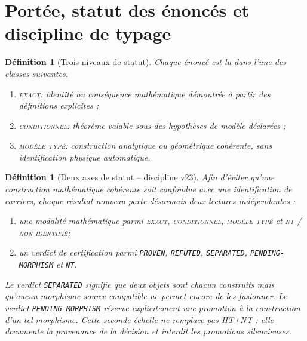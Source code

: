 \documentclass[11pt,a4paper]{article}
\newtheorem{definition}[theorem]{Définition}
\newcommand{\rank}{\operatorname{rank}}
\newcommand{\statusExact}{\textsc{exact}}
\newcommand{\statusCond}{\textsc{conditionnel}}
\newcommand{\statusTyped}{\textsc{modèle typé}}
\newcommand{\statusNT}{\textsc{nt / non identifié}}
\newcommand{\certProven}{\texttt{PROVEN}}
\newcommand{\certRefuted}{\texttt{REFUTED}}
\newcommand{\certSeparated}{\texttt{SEPARATED}}
\newcommand{\certPending}{\texttt{PENDING-MORPHISM}}
\newcommand{\certNT}{\texttt{NT}}
\begin{document}
\begin{abstract}
La version v28 matérialise enfin un census machine-readable des neuf arêtes des deux germes historiques effectivement audités, avec les champs $(\tau_e,L_e,\sigma_e,\varepsilon_e)$, et rejoue directement le test de rang tordu. Le croisement $X_6$ donne $\rank D_c=\rank[D_c\mid s]=5$ et la fissure $Y_3$ donne $3=3$. Le corpus ne fournit toutefois pas l'énumération exhaustive du graphe dual historique : le verdict global reste NT plutôt que d'être complété artificiellement. Sur le fibré Krein, la partie continue est paramétrée par une rapidité additive $\chi$ dans $SO^+(1,1)$; son holonomie est nulle sur le croisement et la fissure audités. Toute obstruction continue restante est donc globale et se réduit à un second test de rang $\rank D_0=\rank[D_0\mid\chi]$ sur le census complet futur.

\end{abstract}

\tableofcontents

\section{Portée, statut des énoncés et discipline de typage}

\begin{definition}[Trois niveaux de statut]
Chaque énoncé est lu dans l'une des classes suivantes.
\begin{enumerate}[label=\textup{(\roman*)}]
\item \statusExact : identité ou conséquence mathématique démontrée à partir des définitions explicites ;
\item \statusCond : théorème valable sous des hypothèses de modèle déclarées ;
\item \statusTyped : construction analytique ou géométrique cohérente, sans identification physique automatique.
\end{enumerate}
\end{definition}

\begin{definition}[Deux axes de statut -- discipline v23]\label{def:v23-two-status-axes}
Afin d'éviter qu'une construction mathématique cohérente soit confondue avec une identification de carriers, chaque résultat nouveau porte désormais deux lectures indépendantes :
\begin{enumerate}[label=\textup{(\roman*)}]
\item une \emph{modalité mathématique} parmi \statusExact{}, \statusCond{}, \statusTyped{} et \statusNT{};
\item un \emph{verdict de certification} parmi \certProven{}, \certRefuted{}, \certSeparated{}, \certPending{} et \certNT{}.
\end{enumerate}
Le verdict \certSeparated{} signifie que deux objets sont chacun construits mais qu'aucun morphisme source-compatible ne permet encore de les fusionner. Le verdict \certPending{} réserve explicitement une promotion à la construction d'un tel morphisme. Cette seconde échelle ne remplace pas HT+NT : elle documente la provenance de la décision et interdit les promotions silencieuses.
\end{definition}
\end{document}
